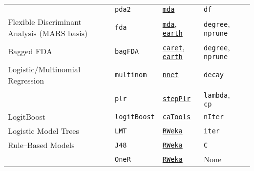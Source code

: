 \documentclass[12pt]{article}
\begin{document}
\begin{landscape}
\begin{longtable}{lllll}
        & \texttt{pda2} & 
             {\tt \href{http://cran.r-project.org/web/packages/mda/index.html}{mda}}       & 
            \texttt{df} & \\     
 
 \rowcolor[rgb]{.95, .95, .95}              
      Flexible Discriminant Analysis (MARS basis) &
         \texttt{fda} & 
             {\tt \href{http://cran.r-project.org/web/packages/mda/index.html}{mda}},  {\tt \href{http://cran.r-project.org/web/packages/earth/index.html}{earth}}       & 
            \texttt{degree}, \texttt{nprune} & \\
      
      Bagged FDA &
         \texttt{bagFDA} & 
             {\tt \href{http://cran.r-project.org/web/packages/caret/index.html}{caret}},   {\tt \href{http://cran.r-project.org/web/packages/earth/index.html}{earth}}      & 
            \texttt{degree}, \texttt{nprune} \\   
            
\rowcolor[rgb]{.95, .95, .95}                     
      Logistic/Multinomial Regression &
         \texttt{multinom} & 
             {\tt \href{http://cran.r-project.org/web/packages/nnet/index.html}{nnet}}     & 
            \texttt{decay}& \\   
      
\rowcolor[rgb]{.95, .95, .95}               
   &
         \texttt{plr} & 
             {\tt \href{http://cran.r-project.org/web/packages/stepPlr/index.html}{stepPlr}}     & 
            \texttt{lambda}, \texttt{cp} & \\     
            
      
      LogitBoost &      
         \texttt{logitBoost} & 
             {\tt \href{http://cran.r-project.org/web/packages/caTools/index.html}{caTools}}      &          
            \texttt{nIter}\\              
            
\rowcolor[rgb]{.95, .95, .95}                     
      Logistic Model Trees &
         \texttt{LMT} & 
            {\tt \href{http://cran.r-project.org/web/packages/RWeka/index.html}{RWeka}}   & 
            \texttt{iter}  \\  
            
      Rule--Based Models &
         \texttt{J48} & 
           {\tt \href{http://cran.r-project.org/web/packages/RWeka/index.html}{RWeka}}   & 
            \texttt{C}  \\  
            
       &
         \texttt{OneR} & 
           {\tt \href{http://cran.r-project.org/web/packages/RWeka/index.html}{RWeka}}   & 
            None  \\  
            

\end{longtable}
\end{landscape}
\end{document}
